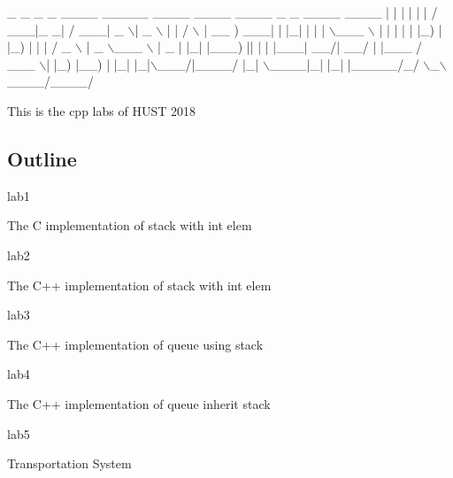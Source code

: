 
\begin{DoxyCode}
 \_   \_ \_   \_ \_\_\_\_ \_\_\_\_\_    \_\_\_\_ \_\_\_\_  \_\_\_\_    \_        \_    \_\_\_\_ \_\_\_\_  
| | | | | | / \_\_\_|\_   \_|  / \_\_\_|  \_ \(\backslash\)|  \_ \(\backslash\)  | |      / \(\backslash\)  | \_\_ ) \_\_\_| 
| |\_| | | | \(\backslash\)\_\_\_ \(\backslash\) | |   | |   | |\_) | |\_) | | |     / \_ \(\backslash\) |  \_ \(\backslash\)\_\_\_ \(\backslash\) 
|  \_  | |\_| |\_\_\_) || |   | |\_\_\_|  \_\_/|  \_\_/  | |\_\_\_ / \_\_\_ \(\backslash\)| |\_) |\_\_) |
|\_| |\_|\(\backslash\)\_\_\_/|\_\_\_\_/ |\_|    \(\backslash\)\_\_\_\_|\_|   |\_|     |\_\_\_\_\_/\_/   \(\backslash\)\_\(\backslash\)\_\_\_\_/\_\_\_\_/ 
\end{DoxyCode}
 This is the cpp labs of H\+U\+ST 2018 \subsection*{Outline}


\begin{DoxyItemize}
\item lab1
\begin{DoxyItemize}
\item The C implementation of stack with int elem
\end{DoxyItemize}
\item lab2
\begin{DoxyItemize}
\item The C++ implementation of stack with int elem
\end{DoxyItemize}
\item lab3
\begin{DoxyItemize}
\item The C++ implementation of queue using stack
\end{DoxyItemize}
\item lab4
\begin{DoxyItemize}
\item The C++ implementation of queue inherit stack
\end{DoxyItemize}
\item lab5
\begin{DoxyItemize}
\item Transportation System 
\end{DoxyItemize}
\end{DoxyItemize}